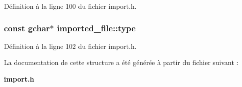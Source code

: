 Définition à la ligne 100 du fichier import.h.

\subsubsection[{type}]{\setlength{\rightskip}{0pt plus 5cm}const gchar$\ast$ {\bf imported\_\-file::type}}\label{structimported__file_a69a7b09e52de8d330bae9a1e9f1391a5}


Définition à la ligne 102 du fichier import.h.



La documentation de cette structure a été générée à partir du fichier suivant :\begin{DoxyCompactItemize}
\item 
{\bf import.h}\end{DoxyCompactItemize}
